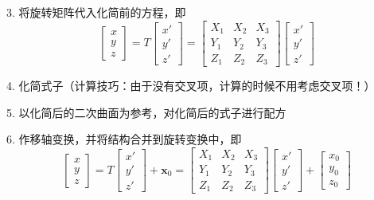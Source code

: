 \par 3. 将旋转矩阵代入化简前的方程，即
\begin{equation}
\left[ 
\begin{array}{c}
x \\
y \\
z
\end{array}
\right] 
=
T
\left[ 
\begin{array}{c}
x' \\
y' \\
z'
\end{array}
\right] 
=
\left[ 
\begin{array}{ccc}
X_1 & X_2 & X_3\\
Y_1 & Y_2 & Y_3\\
Z_1 & Z_2 & Z_3
\end{array}
\right] 
\left[ 
\begin{array}{c}
x' \\
y' \\
z'
\end{array}
\right] 
\end{equation}
\par 4. 化简式子（{\color{dy}计算技巧：由于没有交叉项，计算的时候不用考虑交叉项！}）
\par 5. 以化简后的二次曲面为参考，对化简后的式子进行配方
\par 6. 作移轴变换，并将结构合并到旋转变换中，即
\begin{equation}
\left[ 
\begin{array}{c}
x \\
y \\
z
\end{array}
\right] 
=
T
\left[ 
\begin{array}{c}
x' \\
y' \\
z'
\end{array}
\right] 
+
\bm{x}_0
=
\left[ 
\begin{array}{ccc}
X_1 & X_2 & X_3\\
Y_1 & Y_2 & Y_3\\
Z_1 & Z_2 & Z_3
\end{array}
\right] 
\left[ 
\begin{array}{c}
x' \\
y' \\
z'
\end{array}
\right] 
+
\left[ 
\begin{array}{c}
x_0 \\
y_0 \\
z_0
\end{array}
\right]
\end{equation}


